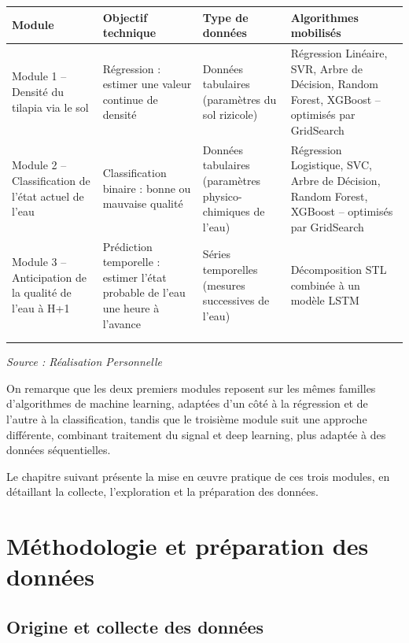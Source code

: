 \documentclass[a4paper,12pt, oneside]{article}
\begin{document}
\begin{longtable}{|m{3cm}|m{4cm}|m{3cm}|m{5cm}|}
\hline
\textbf{Module} & \textbf{Objectif technique} & \textbf{Type de données} & \textbf{Algorithmes mobilisés} \\
\hline

Module 1 -- Densité du tilapia via le sol &
Régression : estimer une valeur continue de densité &
Données tabulaires (paramètres du sol rizicole) &
Régression Linéaire, SVR, Arbre de Décision, Random Forest, XGBoost -- optimisés par GridSearch \\
\hline
Module 2 -- Classification de l'état actuel de l'eau &
Classification binaire : bonne ou mauvaise qualité &
Données tabulaires (paramètres physico-chimiques de l'eau) &
Régression Logistique, SVC, Arbre de Décision, Random Forest, XGBoost -- optimisés par GridSearch \\
\hline
Module 3 -- Anticipation de la qualité de l'eau à H+1 &
Prédiction temporelle : estimer l'état probable de l'eau une heure à l'avance &
Séries temporelles (mesures successives de l'eau) &
Décomposition STL combinée à un modèle LSTM \\
\hline
\caption{Cartographie des trois modules du système\\}
\end{longtable}
\begin{center}
\vspace{-0.85cm}
\textit{Source : Réalisation Personnelle}
\end{center}

On remarque que les deux premiers modules reposent sur les mêmes familles d'algorithmes de machine learning, adaptées d'un côté à la régression et de l'autre à la classification, tandis que le troisième module suit une approche différente, combinant traitement du signal et deep learning, plus adaptée à des données séquentielles.

Le chapitre suivant présente la mise en œuvre pratique de ces trois modules, en détaillant la collecte, l'exploration et la préparation des données.


\section{Méthodologie et préparation des données}
\subsection{Origine et collecte des données}
\end{document}
